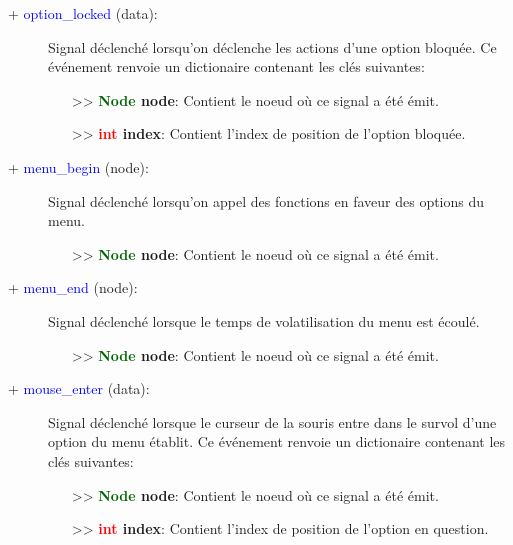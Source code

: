 \documentclass[a4paper, 11pt]{article}
\begin{document}
	\begin{description}
		\item [+ \textcolor{blue}{option\_locked} (data):] Signal déclenché lorsqu'on déclenche les actions
		d'une option bloquée. Ce événement renvoie un dictionaire contenant les clés suivantes:
		\begin{itemize}
			\item [>> \textbf{\textcolor{darkgreen}{Node} node}:] Contient le noeud où ce signal a été émit.
			\item [>> \textbf{\textcolor{red}{int} index}:] Contient l'index de position de l'option 
			bloquée.\\
		\end{itemize}
	\end{description}
	\begin{description}
		\item [+ \textcolor{blue}{\hypertarget{mbegin}{menu\_begin}} (node):] Signal déclenché lorsqu'on 
		appel des fonctions en faveur des options du menu.
		\begin{itemize}
			\item [>> \textbf{\textcolor{darkgreen}{Node} node}:] Contient le noeud où ce signal a été émit.
			\\
		\end{itemize}
	\end{description}
	\begin{description}
		\item [+ \textcolor{blue}{\hypertarget{mend}{menu\_end}} (node):] Signal déclenché lorsque le temps 
		de volatilisation du menu est écoulé.
		\begin{itemize}
			\item [>> \textbf{\textcolor{darkgreen}{Node} node}:] Contient le noeud où ce signal a été émit.
			\\
		\end{itemize}
	\end{description}
	\begin{description}
		\item [+ \textcolor{blue}{mouse\_enter} (data):] Signal déclenché lorsque le curseur de la souris 
		entre dans le survol d'une option du menu établit. Ce événement renvoie un dictionaire contenant les 
		clés suivantes:
		\begin{itemize}
			\item [>> \textbf{\textcolor{darkgreen}{Node} node}:] Contient le noeud où ce signal a été émit.
			\item [>> \textbf{\textcolor{red}{int} index}:] Contient l'index de position de l'option en 
			question.\\
		\end{itemize}
	\end{description}
\end{document}

